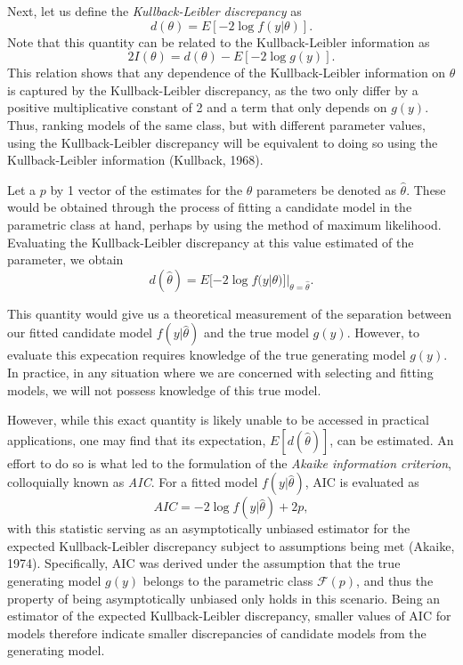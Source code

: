 		Next, let us define the \textit{Kullback-Leibler discrepancy} as
		\begin{equation}
			d(\theta) = E[-2 \log f(y|\theta)] .
		\end{equation}
		Note that this quantity can be related to the Kullback-Leibler information as
		\begin{equation}
			2 I(\theta) = d(\theta) - E \left[ -2 \log g(y) \right].
		\end{equation}
		This relation shows that any dependence of the Kullback-Leibler information on $\theta$ is captured by the Kullback-Leibler discrepancy, as the two only differ by a positive
		multiplicative constant of 2 and a term that only depends on $g(y)$. Thus, ranking models of the same class, but with different parameter values, using the Kullback-Leibler
		discrepancy will be equivalent to doing so using the Kullback-Leibler information (Kullback, 1968).
		
		Let a $p$ by 1 vector of the estimates for the $\theta$ parameters be denoted as $\hat{\theta}$. These would be obtained through the process of fitting a candidate model in the
		parametric class at hand, perhaps by using the method of maximum likelihood. Evaluating the Kullback-Leibler discrepancy at this value estimated of the parameter, we obtain
		\begin{equation}
			d(\hat{\theta}) = E [ -2 \log f(y | \theta)]|_{\theta = \hat{\theta}}.
		\end{equation}

		This quantity would give us a theoretical measurement of the separation between our fitted candidate model $f(y|\hat{\theta})$ and the true model $g(y)$. However, to
		evaluate this expecation requires knowledge of the true generating model $g(y)$. In practice, in any situation where we are concerned with selecting and fitting models,
		we will not possess knowledge of this true model.

		However, while this exact quantity is likely unable to be accessed in practical applications, one may find that its expectation, $E[d(\hat{\theta})]$, can be estimated. An
		effort to do so is what led to the formulation of the \textit{Akaike information criterion}, colloquially known as \textit{AIC}. For a fitted model $f(y|\hat{\theta})$,
		AIC is evaluated as
		\begin{equation}
			AIC = -2 \log f(y|\hat{\theta}) + 2 p,
		\end{equation}
		with this statistic serving as an asymptotically unbiased estimator for the expected Kullback-Leibler discrepancy subject to assumptions being met (Akaike, 1974). Specifically, AIC was derived
		under the assumption that the true generating model $g(y)$ belongs to the parametric class $\mathcal{F}(p)$, and thus the property of being asymptotically unbiased only
		holds in this scenario. Being an estimator of the expected Kullback-Leibler discrepancy, smaller values of AIC for models therefore indicate smaller discrepancies of candidate
		models from the generating model.  

